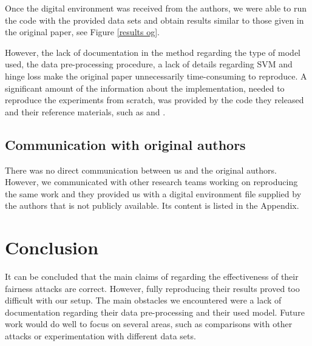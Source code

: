 Once the digital environment was received from the authors, we were able to run the code with the provided data sets and obtain results similar to those given in the original paper, see Figure \ref{results og}. 


However, the lack of documentation in the method regarding the type of model used, the data pre-processing procedure, a lack of details regarding SVM and hinge loss make the original paper unnecessarily time-consuming to reproduce. A significant amount of the information about the implementation, needed to reproduce the experiments from scratch, was provided by the code they released and their reference materials, such as \cite{koh2018stronger} and \cite{zafar2015learning}.


\subsection{Communication with original authors}

There was no direct communication between us and the original authors. However, we communicated with other research teams working on reproducing the same work and they provided us with a digital environment file supplied by the authors that is not publicly available. Its content is listed in the Appendix.
 
\section{Conclusion}
It can be concluded that the main claims of \cite{mehrabi2020exacerbating} regarding the effectiveness of their fairness attacks are correct. However, fully reproducing their results proved too difficult with our setup. The main obstacles we encountered were a lack of documentation regarding their data pre-processing and their used model. Future work would do well to focus on several areas, such as comparisons with other attacks or experimentation with different data sets.

\newpage


\newpage
\appendix

